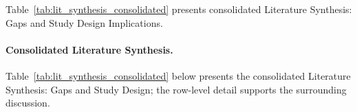 



\noindent Table~\ref{tab:lit_synthesis_consolidated} presents consolidated Literature Synthesis: Gaps and Study Design Implications.

\paragraph{Consolidated Literature Synthesis.}


\noindent Table~\ref{tab:lit_synthesis_consolidated} below presents the consolidated Literature Synthesis: Gaps and Study Design; the row-level detail supports the surrounding discussion.

